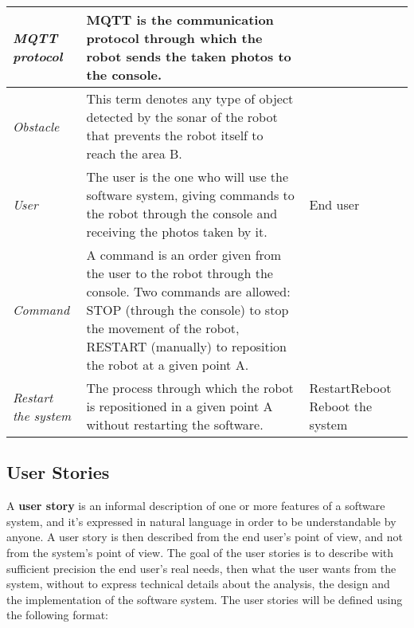 \documentclass[a4paper]{article}
\begin{document}
\begin{tabular}{ | m{3cm} | m{9cm} | m{3cm} | }
	\hline
	
	\textit{MQTT protocol} & MQTT is the communication protocol through which the robot sends the taken photos to the console. &\\
	
	\hline
	
	\textit{Obstacle} & This term denotes any type of object detected by the sonar of the robot that prevents the robot itself to reach the area B. & \\
	
	\hline
	
	\textit{User} & The user is the one who will use the software system, giving commands to the robot through the console and receiving the photos taken by it. & End user\\
	
	\hline
	
	\textit{Command} & A command is an order given from the user to the robot through the console. Two commands are allowed: STOP (through the console) to stop the movement of the robot, RESTART (manually) to reposition the robot at a given point A. &\\
	
	\hline
	
	\textit{Restart the system} & The process through which the robot is repositioned in a given point A without restarting the software. & Restart\newline Reboot \newline Reboot the system\\
	
	\hline 

\end{tabular}


\subsection {User Stories}

A \textbf{user story}  is an informal description of one or more features of a software system, and it's expressed in natural language in order to be understandable by anyone. A user story is then described from the end user's point of view, and not from the system's point of view. \newline\newline
The goal of the user stories is to describe with sufficient precision the end user's real needs, then what the user wants from the system, without to express technical details about the analysis, the design and the implementation of the software system. \newline\newline
The user stories will be defined using the following format:
\end{document}
